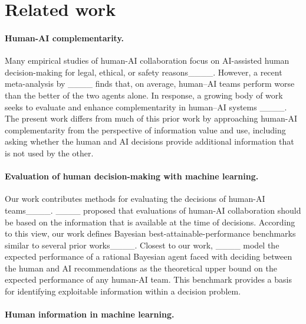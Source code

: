 \section{Related work}
\mvspace{-2mm}
\paragraph{Human-AI complementarity.}

Many empirical studies of human-AI collaboration focus on AI-assisted human decision-making for legal, ethical, or safety reasons____.
However, a recent meta-analysis by ____ finds that, on average, human–AI teams perform worse than the better of the two agents alone. 
In response, a growing body of work seeks to evaluate and enhance complementarity in human–AI systems ____.
The present work differs from much of this prior work by approaching human-AI complementarity from the perspective of information value and use, including asking whether the human and AI decisions provide additional information that is not used by the other.
\mvspace{-2mm}
\paragraph{Evaluation of human decision-making with machine learning.}
Our work contributes methods for evaluating the decisions of human-AI teams____.
____ proposed that evaluations of human-AI collaboration should be based on the information that is available at the time of decisions.
According to this view, our work defines Bayesian best-attainable-performance benchmarks similar to several prior works____. 
Closest to our work, ____ model the expected performance of a rational Bayesian agent faced with deciding between the human and AI recommendations as the theoretical upper bound on the expected performance of any human-AI team.
This benchmark provides a basis for identifying exploitable information within a decision problem.

\mvspace{-3mm}
\paragraph{Human information in machine learning.}

